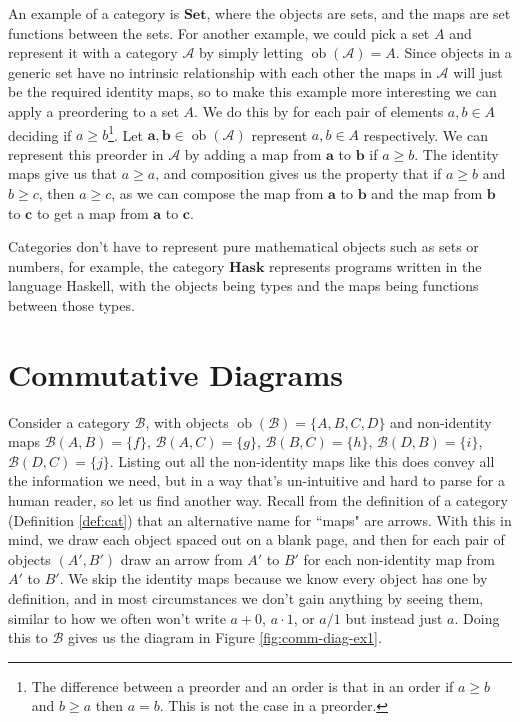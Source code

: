 \documentclass[logo,bsc,singlespacing,parskip]{infthesis}
\theoremstyle{definition}
\newcommand{\cat}[1]{\mathscr{#1}}
\newcommand{\ob}[1]{\obj(\mathscr{#1})}
\DeclareMathOperator{\obj}{ob}
\begin{document}
An example of a category is $\mathbf{Set}$, where the objects are sets, and the maps are set functions between the sets. For another example, we could pick a set $A$ and represent it with a category $\cat{A}$ by simply letting $\ob{A} = A$. Since objects in a generic set have no intrinsic relationship with each other the maps in $\cat{A}$ will just be the required identity maps, so to make this example more interesting we can apply a preordering to a set $A$. We do this by for each pair of elements $a,b \in A$ deciding if $a \ge b$\footnote{The difference between a preorder and an order is that in an order if $a \ge b$ and $b \ge a$ then $a = b$. This is not the case in a preorder.}. Let $\mathbf{a}, \mathbf{b} \in \ob{A}$ represent $a,b \in A$ respectively. We can represent this preorder in $\cat A$ by adding a map from $\mathbf{a}$ to $\mathbf{b}$ if $a \ge b$. The identity maps give us that $a \ge a$, and composition gives us the property that if $a \ge b$ and $b \ge c$, then $a \ge c$, as we can compose the map from $\mathbf{a}$ to $\mathbf{b}$ and the map from $\mathbf{b}$ to $\mathbf{c}$ to get a map from $\mathbf{a}$ to $\mathbf{c}$. 

Categories don't have to represent pure mathematical objects such as sets or numbers, for example, the category $\mathbf{Hask}$ \cite{wiki:hask} represents programs written in the language Haskell, with the objects being types and the maps being functions between those types. 

\section{Commutative Diagrams}\label{bkg:diag}
Consider a category $\cat B$, with objects $\ob{B} = \{A,B,C,D\}$ and non-identity maps $\cat{B}(A,B) = \{f\}$, $\cat{B}(A,C) = \{g\}$, $\cat{B}(B,C) = \{h\}$, $\cat{B}(D,B) = \{i\}$, $\cat{B}(D,C) = \{j\}$. Listing out all the non-identity maps like this does convey all the information we need, but in a way that's un-intuitive and hard to parse for a human reader, so let us find another way. Recall from the definition of a category (Definition \ref{def:cat}) that an alternative name for ``maps" are arrows. With this in mind, we draw each object spaced out on a blank page, and then for each pair of objects $(A', B')$ draw an arrow from $A'$ to $B'$ for each non-identity map from $A'$ to $B'$. We skip the identity maps because we know every object has one by definition, and in most circumstances we don't gain anything by seeing them, similar to how we often won't write $a + 0$, $a \cdot 1$, or $a/1$ but instead just $a$. Doing this to $\cat B$ gives us the diagram in Figure \ref{fig:comm-diag-ex1}.
\end{document}
